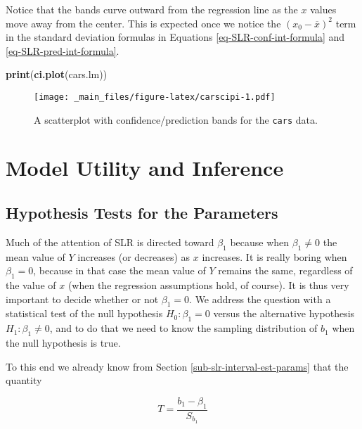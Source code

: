 \documentclass[]{book}
\newenvironment{Shaded}{\begin{snugshade}}{\end{snugshade}}
\newcommand{\KeywordTok}[1]{\textcolor[rgb]{0.13,0.29,0.53}{\textbf{{#1}}}}
\newcommand{\NormalTok}[1]{{#1}}
\numberwithin{equation}{chapter}
\numberwithin{figure}{chapter}
\theoremstyle{plain}
\theoremstyle{definition}
\theoremstyle{remark}
\theoremstyle{definition}
\theoremstyle{definition}
\theoremstyle{remark}
\begin{document}
Notice that the bands curve outward from the regression line as the
\(x\) values move away from the center. This is expected once we notice
the \((x_{0}-\overline{x})^{2}\) term in the standard deviation formulas
in Equations \eqref{eq-SLR-conf-int-formula} and
\eqref{eq-SLR-pred-int-formula}.

\begin{Shaded}
\begin{Highlighting}[]
\KeywordTok{print}\NormalTok{(}\KeywordTok{ci.plot}\NormalTok{(cars.lm))}
\end{Highlighting}
\end{Shaded}

\begin{figure}[htbp]
\centering
\texttt{[image: \_main\_files/figure-latex/carscipi-1.pdf]}
\caption{\label{fig:carscipi}\small A scatterplot with confidence/prediction bands
for the \texttt{cars} data.}
\end{figure}




\section{Model Utility and Inference}\label{sec-model-utility-slr}

\subsection{Hypothesis Tests for the
Parameters}\label{sub-slr-hypoth-test-params}

Much of the attention of SLR is directed toward \(\beta_{1}\) because
when \(\beta_{1}\neq 0\) the mean value of \(Y\) increases (or
decreases) as \(x\) increases. It is really boring when \(\beta_{1}=0\),
because in that case the mean value of \(Y\) remains the same,
regardless of the value of \(x\) (when the regression assumptions hold,
of course). It is thus very important to decide whether or not
\(\beta_{1} = 0\). We address the question with a statistical test of
the null hypothesis \(H_{0}:\beta_{1}=0\) versus the alternative
hypothesis \(H_{1}:\beta_{1}\neq0\), and to do that we need to know the
sampling distribution of \(b_{1}\) when the null hypothesis is true.

To this end we already know from Section
\ref{sub-slr-interval-est-params} that the quantity

\begin{equation} 
T=\frac{b_{1}-\beta_{1}}{S_{b_{1}}}
\end{equation}
\end{document}
